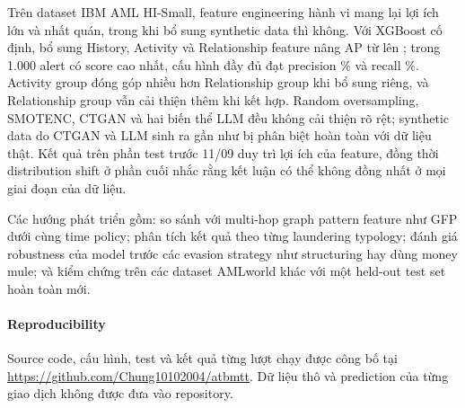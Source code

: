 \documentclass[sigconf,nonacm]{acmart}
\begin{document}
Trên dataset IBM AML HI-Small, feature engineering hành vi mang lại lợi ích lớn và nhất quán, trong khi bổ sung
synthetic data thì không. Với XGBoost cố định, bổ sung History, Activity và Relationship feature nâng AP từ \FZeroAP{}
lên \FFourAP; trong 1.000 alert có score cao nhất, cấu hình đầy đủ đạt precision \FFourPkPct\% và recall
\FFourRkPct\%. Activity group đóng góp nhiều hơn Relationship group khi bổ sung riêng, và Relationship group vẫn cải
thiện thêm khi kết hợp. Random oversampling, SMOTENC, CTGAN và hai biến thể LLM đều không cải thiện rõ rệt; synthetic
data do CTGAN và LLM sinh ra gần như bị phân biệt hoàn toàn với dữ liệu thật. Kết quả trên phần test trước 11/09 duy
trì lợi ích của feature, đồng thời distribution shift ở phần cuối nhắc rằng kết luận có thể không đồng nhất ở mọi giai
đoạn của dữ liệu.

Các hướng phát triển gồm: so sánh với multi-hop graph pattern feature như GFP dưới cùng time policy; phân tích kết
quả theo từng laundering typology; đánh giá robustness của model trước các evasion strategy như structuring hay dùng
money mule; và kiểm chứng trên các dataset AMLworld khác với một held-out test set hoàn toàn mới.

\paragraph{Reproducibility} Source code, cấu hình, test và kết quả từng lượt chạy được công bố tại
\url{https://github.com/Chung10102004/atbmtt}. Dữ liệu thô và prediction của từng giao dịch không được đưa vào
repository.



\end{document}
